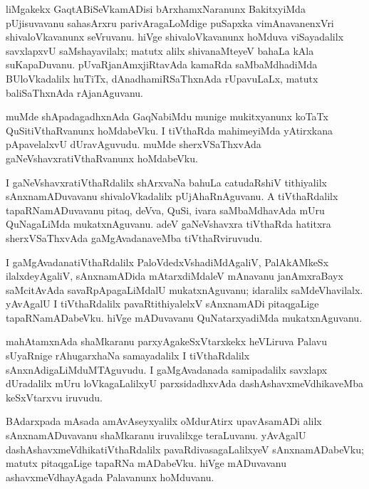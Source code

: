 \documentclass{article}
\begin{document}
\begin{mn}
liMgakekx GaqtABiSeVkamADisi bArxhamxNaranunx BakitxyiMda pUjisuvavanu sahasArxru 
parivAragaLoMdige puSapxka vimAnavanenxVri shivaloVkavanunx seVruvanu. hiVge 
shivaloVkavanunx hoMduva viSayadalilx savxlapxvU saMshayavilalx; matutx alilx shivanaMteyeV bahaLa 
kAla suKapaDuvanu. pUvaRjanAmxjiRtavAda  kamaRda saMbaMdhadiMda BUloVkadalilx huTiTx, 
dAnadhamiRSaThxnAda rUpavuLaLx, matutx baliSaThxnAda rAjanAguvanu.

\end{mn}

\begin{mn}
muMde shApadagadhxnAda GaqNabiMdu munige mukitxyanunx koTaTx QuSitiVthaRvanunx hoMdabeVku. I 
tiVthaRda mahimeyiMda yAtirxkana pApavelalxvU dUravAguvudu. muMde sherxVSaThxvAda 
gaNeVshavxratiVthaRvanunx hoMdabeVku.
\end{mn}

\begin{mn}
I gaNeVshavxratiVthaRdalilx  shArxvaNa bahuLa catudaRshiV tithiyalilx sAnxnamADuvavanu 
shivaloVkadalilx pUjAhaRnAguvanu. A tiVthaRdalilx tapaRNamADuvavanu pitaq, deVva, QuSi, ivara
saMbaMdhavAda mUru QuNagaLiMda mukatxnAguvanu. adeV gaNeVshavxra tiVthaRda hatitxra sherxVSaThxvAda 
gaMgAvadanaveMba tiVthaRviruvudu.
\end{mn}

\begin{mn}
I gaMgAvadanatiVthaRdalilx PaloVdedxVshadiMdAgaliV, PalAkAMkeSx ilalxdeyAgaliV, sAnxnamADida  
mAtarxdiMdaleV mAnavanu  janAmxraBayx saMcitAvAda savaRpApagaLiMdalU mukatxnAguvanu; idaralilx 
saMdeVhavilalx. yAvAgalU I tiVthaRdalilx pavaRtithiyalelxV sAnxnamADi pitaqgaLige tapaRNamADabeVku. 
hiVge mADuvavanu QuNatarxyadiMda mukatxnAguvanu.
\end{mn}

\begin{mn}
mahAtamxnAda shaMkaranu parxyAgakeSxVtarxkekx heVLiruva Palavu sUyaRnige rAhugarxhaNa 
samayadalilx  I tiVthaRdalilx sAnxnAdigaLiMduMTAguvudu. I gaMgAvadanada samipadalilx savxlapx 
dUradalilx mUru loVkagaLalilxyU parxsidadhxvAda dashAshavxmeVdhikaveMba keSxVtarxvu iruvudu.
\end{mn}

\begin{mn}
BAdarxpada mAsada amAvAseyxyalilx oMdurAtirx upavAsamADi alilx sAnxnamADuvavanu shaMkaranu 
iruvalilxge teraLuvanu. yAvAgalU dashAshavxmeVdhikatiVthaRdalilx pavaRdivasagaLalilxyeV 
sAnxnamADabeVku; matutx pitaqgaLige tapaRNa mADabeVku. hiVge mADuvavanu ashavxmeVdhayAgada 
Palavanunx hoMduvanu.
\end{mn}
\end{document}
